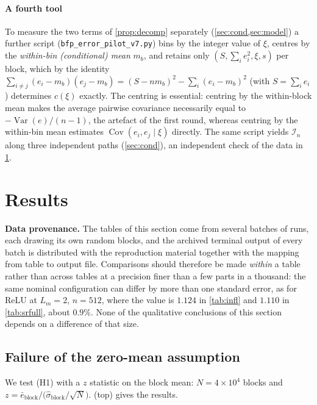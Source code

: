 \documentclass[twocolumn,review,hidelinks,oneeqnum,onetabnum,onefignum,onethmnum]{siamart251216}
\begin{document}
\paragraph{A fourth tool} To measure the two terms of \cref{prop:decomp} separately
(\cref{sec:cond,sec:model}) a further script
(\texttt{bfp\_error\_pilot\_v7.py}) bins by the integer value of $\xi$, centres by
the \emph{within-bin (conditional) mean} $m_b$, and retains only
$(S,\sum_i e_i^2,\xi,s)$ per block, which by the identity
$\sum_{i\ne j}(e_i-m_b)(e_j-m_b)=(S-nm_b)^2-\sum_i(e_i-m_b)^2$ (with
$S=\sum_i e_i$) determines $c(\xi)$ exactly. The centring is essential: centring
by the within-block mean makes the average pairwise covariance necessarily equal to
$-\operatorname{Var}(e)/(n-1)$, the artefact of the first round, whereas centring
by the within-bin mean estimates $\operatorname{Cov}(e_i,e_j\mid\xi)$ directly. The
same script yields $\mathcal I_n$ along three independent paths (\cref{sec:cond}),
an independent check of the data in \cref{sec:results}.

\section{Results}
\label{sec:results}

\noindent\textbf{Data provenance.} The tables of this section come from several
batches of runs, each drawing its own random blocks, and the archived terminal
output of every batch is distributed with the reproduction material together with
the mapping from table to output file. Comparisons should therefore be made
\emph{within} a table rather than across tables at a precision finer than a few
parts in a thousand: the same nominal configuration can differ by more than one
standard error, as for ReLU at $L_m=2$, $n=512$, where the value is $1.124$ in
\cref{tab:infl} and $1.110$ in \cref{tab:srfull}, about $0.9\%$. None of the
qualitative conclusions of this section depends on a difference of that size.

\subsection{Failure of the zero-mean assumption}
\label{sec:bias}

We test (H1) with a $z$ statistic on the block mean: $N=4\times10^4$ blocks and
$z=\bar e_{\text{block}}/\bigl(\hat\sigma_{\text{block}}/\sqrt N\bigr)$.
 (top) gives the results.
\end{document}
